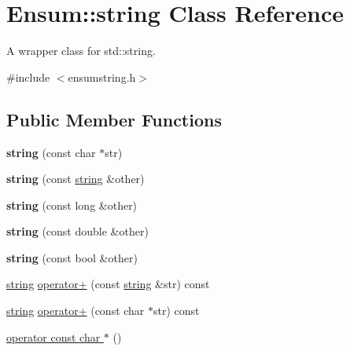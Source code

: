 \hypertarget{class_ensum_1_1string}{}\section{Ensum\+:\+:string Class Reference}
\label{class_ensum_1_1string}


A wrapper class for std\+::string.  




{\ttfamily \#include $<$ensumstring.\+h$>$}

\subsection*{Public Member Functions}
\begin{DoxyCompactItemize}
\item 
{\bfseries string} (const char $\ast$str)\hypertarget{class_ensum_1_1string_a1efde732b942cf5b4a9aeff02836c7f4}{}\label{class_ensum_1_1string_a1efde732b942cf5b4a9aeff02836c7f4}

\item 
{\bfseries string} (const \hyperlink{class_ensum_1_1string}{string} \&other)\hypertarget{class_ensum_1_1string_a941a6aeb4f7e6f8a61a375a19ada9e36}{}\label{class_ensum_1_1string_a941a6aeb4f7e6f8a61a375a19ada9e36}

\item 
{\bfseries string} (const long \&other)\hypertarget{class_ensum_1_1string_ab94e9717ef713acd5981ad9d2c9d0a5e}{}\label{class_ensum_1_1string_ab94e9717ef713acd5981ad9d2c9d0a5e}

\item 
{\bfseries string} (const double \&other)\hypertarget{class_ensum_1_1string_ad2d7d12b303783eb4ecc32a389e1c42b}{}\label{class_ensum_1_1string_ad2d7d12b303783eb4ecc32a389e1c42b}

\item 
{\bfseries string} (const bool \&other)\hypertarget{class_ensum_1_1string_a82ccf9bec24664a575b8e9c70cbd7d99}{}\label{class_ensum_1_1string_a82ccf9bec24664a575b8e9c70cbd7d99}

\item 
\hyperlink{class_ensum_1_1string}{string} \hyperlink{class_ensum_1_1string_a13098a5e0f0fd18baeffa5bc8b35494d}{operator+} (const \hyperlink{class_ensum_1_1string}{string} \&str) const 
\item 
\hyperlink{class_ensum_1_1string}{string} \hyperlink{class_ensum_1_1string_aa9f884ae697a27d375d6dc71fd5a1602}{operator+} (const char $\ast$str) const 
\item 
\hyperlink{class_ensum_1_1string_a4ef9b111d0bcd2cbd6ef125449253209}{operator const char $\ast$} ()\hypertarget{class_ensum_1_1string_a4ef9b111d0bcd2cbd6ef125449253209}{}\label{class_ensum_1_1string_a4ef9b111d0bcd2cbd6ef125449253209}


\end{DoxyCompactItemize}
